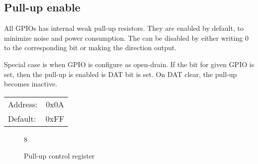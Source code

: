 \documentclass{article}
\begin{document}
	\subsection{Pull-up enable}

	All GPIOs has internal weak pull-up resistors. They are enabled by default, to minimize
	noise and power consumption. The can be disabled by either writing 0 to the corresponding
	bit or making the direction output.
	\par
	Special case is when GPIO is configure as open-drain. If the bit for given GPIO is set, then
	the pull-up is enabled is DAT bit is set. On DAT clear, the pull-up becomes inactive.

	\begin{tabular}{ l c }
		Address: & 0x0A \\
		Default: & 0xFF \\
	\end{tabular}

	\begin{figure}[H]
		\centering
		\begin{bytefield}[
			bitwidth=0.1\linewidth]{8}
			 \\
		\end{bytefield}
		\caption{Pull-up control register}
		\label{reg:pullup}
	\end{figure}
\end{document}
